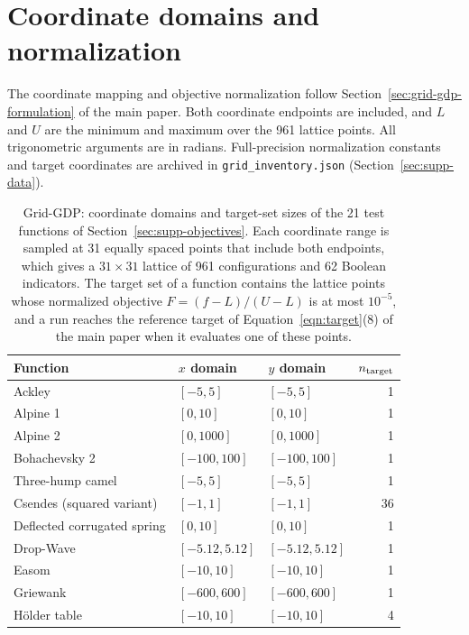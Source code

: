 \section{Coordinate domains and normalization}\label{sec:supp-domains}
The coordinate mapping and objective normalization follow Section~\ifdefined\manuscriptwithsupplement\ref{sec:grid-gdp-formulation}\fi{} of the main paper.
Both coordinate endpoints are included, and \(L\) and \(U\) are the minimum and maximum over the 961 lattice points.
All trigonometric arguments are in radians.
Full-precision normalization constants and target coordinates are archived in \nolinkurl{grid_inventory.json} (Section~\ref{sec:supp-data}).

\begin{table}[htbp]
\centering
\caption{Grid-GDP: coordinate domains and target-set sizes of the 21 test functions of Section~\ref{sec:supp-objectives}.
Each coordinate range is sampled at 31 equally spaced points that include both endpoints, which gives a \(31\times31\) lattice of 961 configurations and 62 Boolean indicators.
The target set of a function contains the lattice points whose normalized objective \(F=(f-L)/(U-L)\) is at most \(10^{-5}\), and a run reaches the reference target of Equation~\ifdefined\manuscriptwithsupplement\eqref{eqn:target}\else(8)\fi{} of the main paper when it evaluates one of these points.}
\label{tab:grid-domains}
\footnotesize
\begin{threeparttable}
\begin{tabular}{@{}lllr@{}}\toprule
Function & \(x\) domain & \(y\) domain & \(n_{\rm target}\)\\\midrule
Ackley & \([-5,5]\) & \([-5,5]\) & 1\\
Alpine 1 & \([0,10]\) & \([0,10]\) & 1\\
Alpine 2 & \([0,1000]\) & \([0,1000]\) & 1\\
Bohachevsky 2 & \([-100,100]\) & \([-100,100]\) & 1\\
Three-hump camel & \([-5,5]\) & \([-5,5]\) & 1\\
Csendes (squared variant) & \([-1,1]\) & \([-1,1]\) & 36\\
Deflected corrugated spring & \([0,10]\) & \([0,10]\) & 1\\
Drop-Wave & \([-5.12,5.12]\) & \([-5.12,5.12]\) & 1\\
Easom & \([-10,10]\) & \([-10,10]\) & 1\\
Griewank & \([-600,600]\) & \([-600,600]\) & 1\\
H\"older table & \([-10,10]\) & \([-10,10]\) & 4\\

\end{tabular}
\end{threeparttable}
\end{table}
